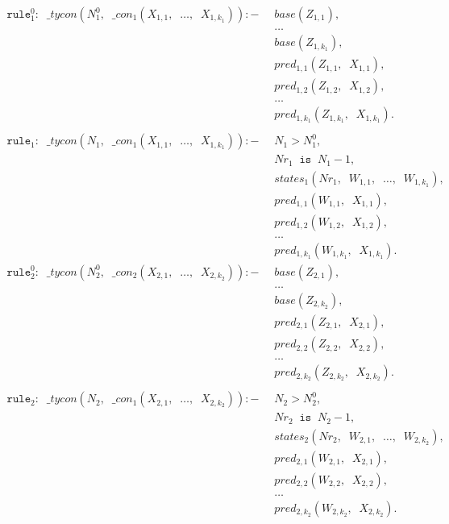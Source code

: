 \documentclass{report}
\theoremstyle{definition}
\theoremstyle{definition}
\newcommand{\ttt}[1]{\texttt{#1}}
\newcommand{\tav}{\;\;}
\begin{document}
\begin{align*}
	\ttt{rule}_{1}^{0}: \tav \_ tycon (N_{1}^{0}, \tav \_ con_1(X_{1,1}, \tav \ldots, \tav X_{1,k_1})) :-
	& \tav base(Z_{1,1}), && \\
	& \tav \ldots && \\
	& \tav base(Z_{1,k_1}), && \\
	& \tav pred_{1, 1}(Z_{1,1}, \tav X_{1,1}), && \\
	& \tav pred_{1, 2}(Z_{1,2}, \tav X_{1,2}), && \\
	& \tav \ldots \tav && \\
	& \tav pred_{1, k_1}(Z_{1,k_1}, \tav X_{1,k_1}). && \\
	\\
	\ttt{rule}_1: \tav \_ tycon (N_1, \tav \_ con_1(X_{1,1}, \tav \ldots, \tav X_{1,k_1})) :-
	& \tav N_1 > N_{1}^{0}, && \\
	& \tav Nr_1 \tav \ttt{is} \tav N_1 - 1, && \\
	& \tav states_1(Nr_1, \tav W_{1,1}, \tav \ldots, \tav W_{1,k_1}), && \\
	& \tav pred_{1, 1}(W_{1,1}, \tav X_{1,1}), && \\
	& \tav pred_{1, 2}(W_{1,2}, \tav X_{1,2}), && \\
	& \tav \ldots \tav && \\
	& \tav pred_{1, k_1}(W_{1,k_1}, \tav X_{1,k_1}). && \\
	\ttt{rule}_{2}^{0}: \tav \_ tycon (N_{2}^{0}, \tav \_ con_2(X_{2,1}, \tav \ldots, \tav X_{2,k_2})) :-
	& \tav base(Z_{2,1}), && \\
	& \tav \ldots && \\
	& \tav base(Z_{2,k_2}), && \\
	& \tav pred_{2, 1}(Z_{2,1}, \tav X_{2,1}), && \\
	& \tav pred_{2, 2}(Z_{2,2}, \tav X_{2,2}), && \\
	& \tav \ldots \tav && \\
	& \tav pred_{2, k_2}(Z_{2,k_2}, \tav X_{2,k_2}). && \\
	\\
	\ttt{rule}_2: \tav \_ tycon (N_2, \tav \_ con_1(X_{2,1}, \tav \ldots, \tav X_{2,k_2})) :-
	& \tav N_2 > N_{2}^{0}, && \\
	& \tav Nr_2 \tav \ttt{is} \tav N_2 - 1, && \\
	& \tav states_2(Nr_2, \tav W_{2,1}, \tav \ldots, \tav W_{2,k_2}), && \\
	& \tav pred_{2, 1}(W_{2,1}, \tav X_{2,1}), && \\
	& \tav pred_{2, 2}(W_{2,2}, \tav X_{2,2}), && \\
	& \tav \ldots \tav && \\
	& \tav pred_{2, k_2}(W_{2,k_2}, \tav X_{2,k_2}). &&
\end{align*}
\end{document}
